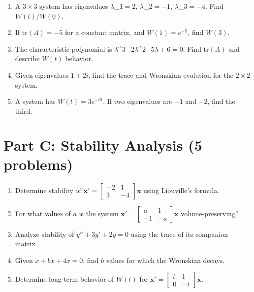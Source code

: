 \documentclass[12pt]{article}
\begin{document}
\begin{enumerate}[resume]
\item A $3 \times 3$ system has eigenvalues $\lambda$_{1}$ = 2$, $\lambda$_{2}$ = -1$, $\lambda$_{3}$ = -4$. Find $W(t)/W(0)$.

\item If $\text{tr}(A) = -5$ for a constant matrix, and $W(1) = e^{-5}$, find $W(3)$.

\item The characteristic polynomial is $\lambda$^{3}$ - 2\lambda$^{2}$ - 5\lambda + 6 = 0$. Find $\text{tr}(A)$ and describe $W(t)$ behavior.

\item Given eigenvalues $1 \pm 2i$, find the trace and Wronskian evolution for the $2 \times 2$ system.

\item A system has $W(t) = 3e^{-6t}$. If two eigenvalues are $-1$ and $-2$, find the third.
\end{enumerate}

\section*{Part C: Stability Analysis (5 problems)}

\begin{enumerate}[resume]
\item Determine stability of $\mathbf{x}' = \begin{bmatrix} -2 & 1 \\ 3 & -4 \end{bmatrix}\mathbf{x}$ using Liouville's formula.

\item For what values of $a$ is the system $\mathbf{x}' = \begin{bmatrix} a & 1 \\ -1 & -a \end{bmatrix}\mathbf{x}$ volume-preserving?

\item Analyze stability of $y'' + 3y' + 2y = 0$ using the trace of its companion matrix.

\item Given $\ddot{x} + b\dot{x} + 4x = 0$, find $b$ values for which the Wronskian decays.

\item Determine long-term behavior of $W(t)$ for $\mathbf{x}' = \begin{bmatrix} t & 1 \\ 0 & -t \end{bmatrix}\mathbf{x}$.
\end{enumerate}
\end{document}
